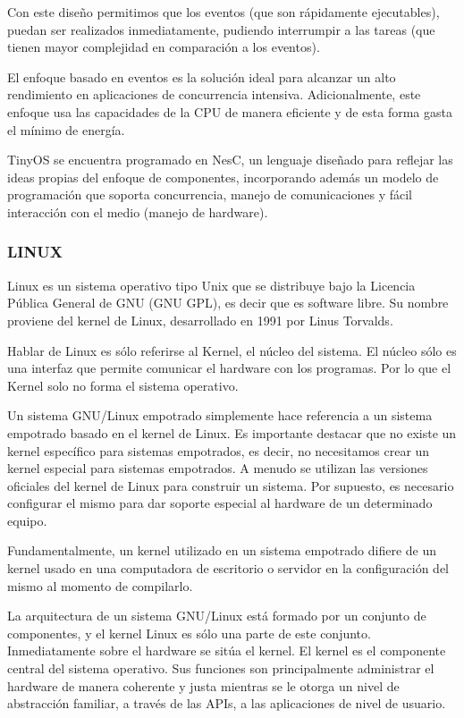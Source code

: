 Con este diseño permitimos que los eventos (que son rápidamente ejecutables), puedan ser realizados inmediatamente, pudiendo interrumpir a las tareas (que tienen mayor complejidad en comparación a los eventos).



El enfoque basado en eventos es la solución ideal para alcanzar un alto rendimiento en aplicaciones de concurrencia intensiva. Adicionalmente, este enfoque usa las capacidades de la CPU de manera eficiente y de esta forma gasta el mínimo de energía.



TinyOS se encuentra programado en NesC, un lenguaje diseñado para reflejar las ideas propias del enfoque de componentes, incorporando además un modelo de programación que soporta concurrencia, manejo de comunicaciones y fácil interacción con el medio (manejo de hardware).



\subsubsection{LINUX}
Linux es un sistema operativo tipo Unix que se distribuye bajo la Licencia Pública General de GNU (GNU GPL), es decir que es software libre. Su nombre proviene del kernel de Linux, desarrollado en 1991 por Linus Torvalds.



Hablar de Linux es sólo referirse al Kernel, el núcleo del sistema. El núcleo sólo es una interfaz que permite comunicar el hardware con los programas. Por lo que el Kernel solo no forma el sistema operativo. 



Un sistema GNU/Linux empotrado simplemente hace referencia a un sistema empotrado basado en el kernel de Linux. Es importante destacar que no existe un kernel específico para sistemas empotrados, es decir, no necesitamos crear un kernel especial para sistemas empotrados. A menudo se utilizan las versiones oficiales del kernel de Linux para construir un sistema. Por supuesto, es necesario configurar el mismo para dar soporte especial al hardware de un determinado equipo.



 Fundamentalmente, un kernel utilizado en un sistema empotrado difiere de un kernel usado en una computadora de escritorio o servidor en la configuración del mismo al momento de compilarlo. 



La arquitectura de un sistema GNU/Linux está formado por un conjunto de componentes, y el kernel Linux es sólo una parte de este conjunto. Inmediatamente sobre el hardware se sitúa el kernel. El kernel es el componente central del sistema operativo. Sus funciones son principalmente administrar el hardware de manera coherente y justa mientras se le otorga un nivel de abstracción familiar, a través de las APIs, a las aplicaciones de nivel de usuario.




